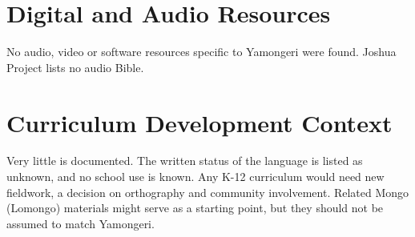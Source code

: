 \documentclass[12pt]{article}
\begin{document}
\section{Digital and Audio Resources}
No audio, video or software resources specific to Yamongeri were found. Joshua Project lists no audio Bible.

\section{Curriculum Development Context}
Very little is documented. The written status of the language is listed as unknown, and no school use is known. Any K-12 curriculum would need new fieldwork, a decision on orthography and community involvement. Related Mongo (Lomongo) materials might serve as a starting point, but they should not be assumed to match Yamongeri.
\end{document}
